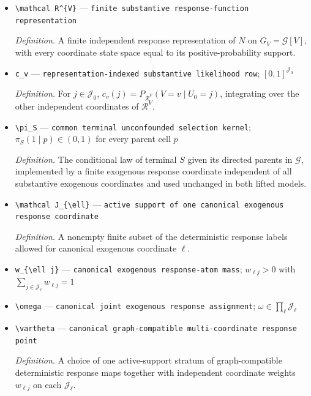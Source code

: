 \documentclass{article}
\begin{document}
\begin{itemize}
  \item \texttt{\textbackslash{}\allowbreak{}mathcal R\textasciicircum{}\{V\}\allowbreak{}} --- \texttt{finite substantive response-\allowbreak{}function representation}
  \par\smallskip\noindent\emph{Definition.} A finite independent response representation of \(N\) on \(G_V=\mathcal G[V]\), with every coordinate state space equal to its positive-probability support.
  \item \texttt{c\_\allowbreak{}v} --- \texttt{representation-\allowbreak{}indexed substantive likelihood row}; \([0,1]^{\mathcal J_0}\)
  \par\smallskip\noindent\emph{Definition.} For \(j\in\mathcal J_0\), \(c_v(j)=P_{\mathcal R^{V}}(V=v\mid U_0=j)\), integrating over the other independent coordinates of \(\mathcal R^{V}\).
  \item \texttt{\textbackslash{}\allowbreak{}pi\_\allowbreak{}S} --- \texttt{common terminal unconfounded selection kernel}; \(\pi_S(1\mid p)\in(0,1)\) for every parent cell \(p\)
  \par\smallskip\noindent\emph{Definition.} The conditional law of terminal \(S\) given its directed parents in \(\mathcal G\), implemented by a finite exogenous response coordinate independent of all substantive exogenous coordinates and used unchanged in both lifted models.
  \item \texttt{\textbackslash{}\allowbreak{}mathcal J\_\allowbreak{}\{\textbackslash{}\allowbreak{}ell\}\allowbreak{}} --- \texttt{active support of one canonical exogenous response coordinate}
  \par\smallskip\noindent\emph{Definition.} A nonempty finite subset of the deterministic response labels allowed for canonical exogenous coordinate \(\ell\).
  \item \texttt{w\_\allowbreak{}\{\textbackslash{}\allowbreak{}ell j\}\allowbreak{}} --- \texttt{canonical exogenous response-\allowbreak{}atom mass}; \(w_{\ell j}>0\) with \(\sum_{j\in\mathcal J_{\ell}}w_{\ell j}=1\)
  \item \texttt{\textbackslash{}\allowbreak{}omega} --- \texttt{canonical joint exogenous response assignment}; \(\omega\in\prod_{\ell}\mathcal J_{\ell}\)
  \item \texttt{\textbackslash{}\allowbreak{}vartheta} --- \texttt{canonical graph-\allowbreak{}compatible multi-\allowbreak{}coordinate response point}
  \par\smallskip\noindent\emph{Definition.} A choice of one active-support stratum of graph-compatible deterministic response maps together with independent coordinate weights \(w_{\ell j}\) on each \(\mathcal J_{\ell}\).

\end{itemize}
\end{document}
